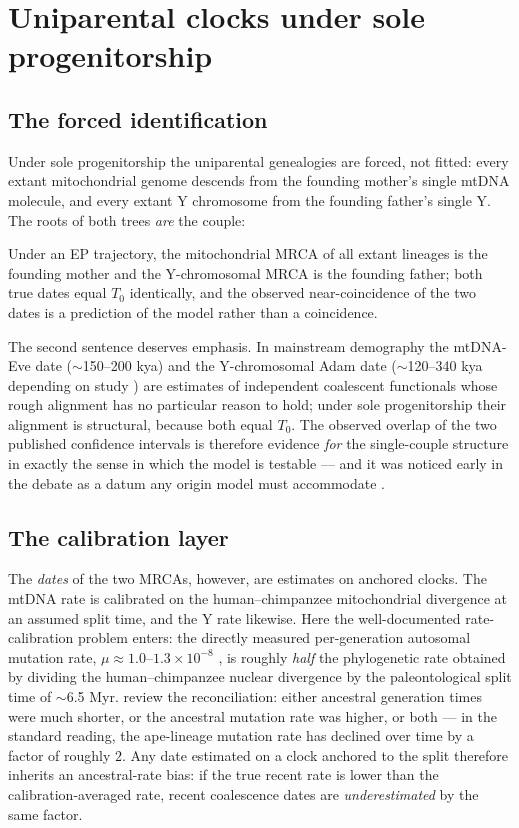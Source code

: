 \section{Uniparental clocks under sole progenitorship}\label{sec:uni}

\subsection{The forced identification}
Under sole progenitorship the uniparental genealogies are forced, not
fitted: every extant mitochondrial genome descends from the founding
mother's single mtDNA molecule, and every extant Y chromosome from the
founding father's single Y. The roots of both trees \emph{are} the couple:

\begin{proposition}\label{prop:uni}
Under an EP trajectory, the mitochondrial MRCA of all extant lineages is
the founding mother and the Y-chromosomal MRCA is the founding father; both
true dates equal $T_0$ identically, and the observed near-coincidence of
the two dates is a prediction of the model rather than a coincidence.
\end{proposition}

The second sentence deserves emphasis. In mainstream demography the
mtDNA-Eve date ($\sim$150--200 kya) and the Y-chromosomal Adam date
($\sim$120--340 kya depending on study \citep{Poznik2013,Mendez2013,
Karmin2016}) are estimates of independent coalescent functionals whose
rough alignment has no particular reason to hold; under sole
progenitorship their alignment is structural, because both equal $T_0$.
The observed overlap of the two published confidence intervals is
therefore evidence \emph{for} the single-couple structure in exactly the
sense in which the model is testable --- and it was noticed early in the
debate as a datum any origin model must accommodate
\citep{Cann1987,Vigilant1991}.

\subsection{The calibration layer}
The \emph{dates} of the two MRCAs, however, are estimates on anchored
clocks. The mtDNA rate is calibrated on the human--chimpanzee mitochondrial
divergence at an assumed split time, and the Y rate likewise. Here the
well-documented rate-calibration problem enters: the directly measured
per-generation autosomal mutation rate, $\mu \approx 1.0$--$1.3\times10^{-8}$
\citep{Scally2012,Jonsson2017}, is roughly \emph{half} the
phylogenetic rate obtained by dividing the human--chimpanzee nuclear
divergence by the paleontological split time of $\sim$6.5 Myr.
\citet{Scally2012} review the reconciliation: either ancestral generation
times were much shorter, or the ancestral mutation rate was higher, or
both --- in the standard reading, the ape-lineage mutation rate has declined
over time by a factor of roughly $2$. Any date estimated on a clock
anchored to the split therefore inherits an ancestral-rate bias: if the
true recent rate is lower than the calibration-averaged rate, recent
coalescence dates are \emph{underestimated} by the same factor.

